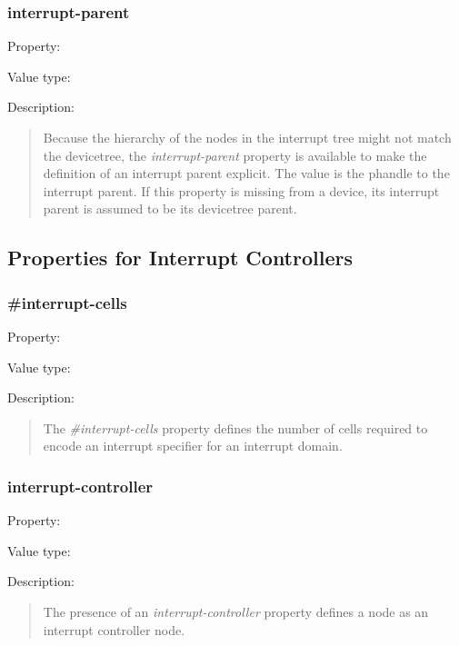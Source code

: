 \documentclass[a4paper,10pt,oneside]{sphinxmanual}
\begin{document}
\subsubsection{interrupt-parent}
\label{devicetree-basics:interrupt-parent}
Property: 

Value type: 

Description:
\begin{quote}

Because the hierarchy of the nodes in the interrupt tree might not match
the devicetree, the \emph{interrupt-parent} property is available to make
the definition of an interrupt parent explicit. The value is the phandle
to the interrupt parent. If this property is missing from a device, its
interrupt parent is assumed to be its devicetree parent.
\end{quote}


\subsection{Properties for Interrupt Controllers}
\label{devicetree-basics:properties-for-interrupt-controllers}

\subsubsection{\#interrupt-cells}
\label{devicetree-basics:interrupt-cells}
Property: 

Value type: 

Description:
\begin{quote}

The \emph{\#interrupt-cells} property defines the number of cells required to
encode an interrupt specifier for an interrupt domain.
\end{quote}


\subsubsection{interrupt-controller}
\label{devicetree-basics:interrupt-controller}
Property: 

Value type: 

Description:
\begin{quote}

The presence of an \emph{interrupt-controller} property defines a node as an
interrupt controller node.
\end{quote}
\end{document}
